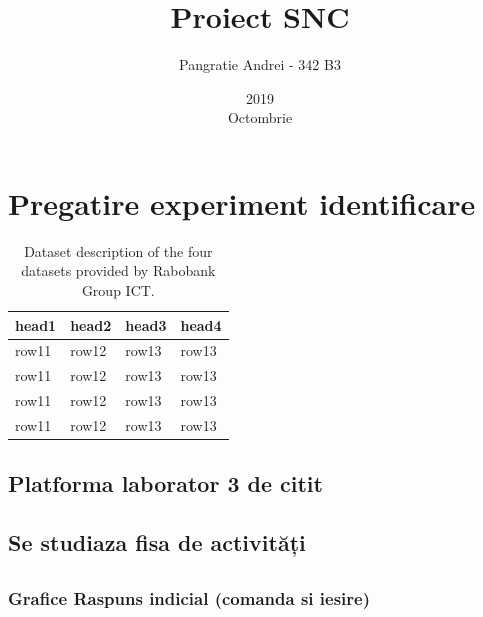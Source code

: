 \documentclass[12pt,english]{article}
\title{Proiect SNC}
\date{2019\\ Octombrie}
\author{Pangratie Andrei - 342 B3}
\begin{document}
\maketitle
\newpage

\tableofcontents
\newpage

\section { Pregatire experiment identificare }
\begin{table}[h!]
  \centering
    \begin{tabular}{|l|l|l|l|}
      \hline
      head1 & head2 & head3 & head4 \\
      \hline
      row11 & row12 & row13 & row13 \\
      \hline
      row11 & row12 & row13 & row13 \\
      \hline
      row11 & row12 & row13 & row13 \\
      \hline
      row11 & row12 & row13 & row13 \\
      \hline
    \end{tabular}
    \caption{Dataset description of the four datasets provided by Rabobank Group ICT.}
\end{table}

\subsection { Platforma laborator 3 de citit }
\subsection { Se studiaza fisa de activități }
\subsection {  }
\subsubsection { Grafice Raspuns indicial (comanda si iesire) }
\begin{center}
\end{center}
\end{document}
